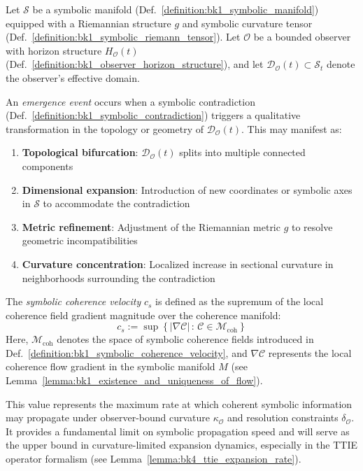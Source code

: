 \begin{definition}
\label{definition:bk1_emergence_event}
Let $\mathcal{S}$ be a symbolic manifold (Def.~\ref{definition:bk1_symbolic_manifold}) equipped with a Riemannian structure $g$ and symbolic curvature tensor (Def.~\ref{definition:bk1_symbolic_riemann_tensor}). Let $\mathcal{O}$ be a bounded observer with horizon structure $H_\mathcal{O}(t)$ (Def.~\ref{definition:bk1_observer_horizon_structure}), and let $\mathcal{D}_\mathcal{O}(t) \subset \mathcal{S}_t$ denote the observer's effective domain.

An \emph{emergence event} occurs when a symbolic contradiction (Def.~\ref{definition:bk1_symbolic_contradiction}) triggers a qualitative transformation in the topology or geometry of $\mathcal{D}_\mathcal{O}(t)$. This may manifest as:
\begin{enumerate}
    \item \textbf{Topological bifurcation}: $\mathcal{D}_\mathcal{O}(t)$ splits into multiple connected components
    \item \textbf{Dimensional expansion}: Introduction of new coordinates or symbolic axes in $\mathcal{S}$ to accommodate the contradiction
    \item \textbf{Metric refinement}: Adjustment of the Riemannian metric $g$ to resolve geometric incompatibilities
    \item \textbf{Curvature concentration}: Localized increase in sectional curvature in neighborhoods surrounding the contradiction
\end{enumerate}
\end{definition}

\begin{definition}
\label{definition:bk1_symbolic_coherence_velocity}
The \emph{symbolic coherence velocity} $c_s$ is defined as the supremum of the local coherence field gradient magnitude over the coherence manifold:
\[
c_s := \sup \left\{ \left| \nabla \mathcal{C} \right| \,:\, \mathcal{C} \in \mathcal{M}_{\text{coh}} \right\}
\]
Here, $\mathcal{M}_{\text{coh}}$ denotes the space of symbolic coherence fields introduced in Def.~\ref{definition:bk1_symbolic_coherence_velocity}, and $\nabla \mathcal{C}$ represents the local coherence flow gradient in the symbolic manifold $M$ (see Lemma~\ref{lemma:bk1_existence_and_uniqueness_of_flow}).

This value represents the maximum rate at which coherent symbolic information may propagate under observer-bound curvature $\kappa_\mathcal{O}$ and resolution constraints $\delta_\mathcal{O}$. It provides a fundamental limit on symbolic propagation speed and will serve as the upper bound in curvature-limited expansion dynamics, especially in the TTIE operator formalism (see Lemma~\ref{lemma:bk4_ttie_expansion_rate}).
\end{definition}

